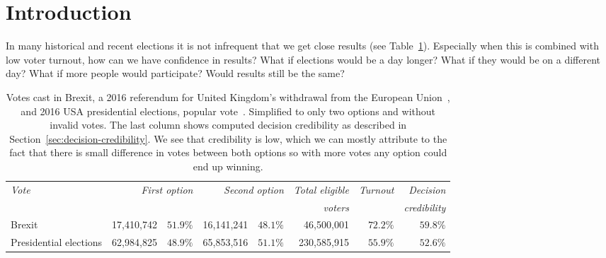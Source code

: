 \documentclass[format=acmsmall, review=true, screen=true, anonymous=true]{acmart}
\begin{document}

%
%


\maketitle

\renewcommand{\shortauthors}{M. Milutinovic et al.}

\section{Introduction}

In many historical and recent elections it is not infrequent that we get close results (see Table~\ref{tab:example}).
Especially when this is combined with low voter turnout, how can we have confidence in results?
What if elections would be a day longer? What if they would be on a different day? What if
more people would participate? Would results still be the same?

\begin{table}
  \centering
  \begin{small}
  \begin{tabular}{l r r r r r r r}
    {\small\textit{Vote}} & \multicolumn{2}{r}{\small \textit{First option}} & \multicolumn{2}{r}{\small \textit{Second option}} & {\small \textit{Total eligible}} & {\small \textit{Turnout}} & {\small \textit{Decision}} \\
    & & & & & {\small \textit{voters}} & & {\small \textit{credibility}} \\
    \midrule
    Brexit & 17,410,742 & $51.9\%$ & 16,141,241 & $48.1\%$ & 46,500,001 & $72.2\%$ & $59.8\%$ \\
    Presidential elections & 62,984,825 & $48.9\%$ & 65,853,516 & $51.1\%$ & 230,585,915 & $55.9\%$ & $52.6\%$ \\
  \end{tabular}
  \end{small}
  \bigskip\caption{Votes cast in Brexit, a 2016 referendum for United Kingdom's withdrawal from the European Union~\protect\cite{brexitresults},
  and 2016 USA presidential elections, popular vote~\protect\cite{usaresults1,usaresults2}. Simplified to only two options and without
  invalid votes. The last column shows computed decision credibility as described in Section~\ref{sec:decision-credibility}. We see that
  credibility is low, which we can mostly attribute to the fact that there is small difference in votes between both options so
  with more votes any option could end up winning.}\label{tab:example}
  \vspace{-0.3cm}
\end{table}
\end{document}
